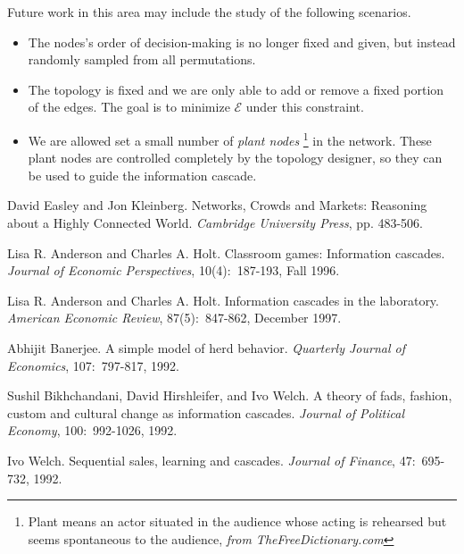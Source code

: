 \documentclass[a4paper,UKenglish]{lipics}
\theoremstyle{definition}
\begin{document}
Future work in this area may include the study of the following scenarios.
\begin{itemize}
\item The nodes's order of decision-making is no longer fixed and given, but instead randomly sampled from all permutations.
\item The topology is fixed and we are only able to add or remove a fixed portion of the edges.
		The goal is to minimize $\mathcal{E}$ under this constraint.
\item We are allowed set a small number of \emph{plant nodes}
	\footnote{Plant means an actor situated in the audience whose acting is rehearsed but seems spontaneous to the audience, 
	\emph{from TheFreeDictionary.com}} in the network.
	These plant nodes are controlled completely by the topology designer, so they can be used to guide the information cascade.
\end{itemize}





\nocite{Simpson}

\begin{thebibliography}{99}

David Easley and Jon Kleinberg. Networks, Crowds and Markets: Reasoning about a Highly Connected World. {\em Cambridge University Press}, pp. 483-506.

Lisa R. Anderson and Charles A. Holt. Classroom games: Information cascades. {\em Journal of Economic Perspectives}, 10(4):~187-193, Fall 1996.

Lisa R. Anderson and Charles A. Holt. Information cascades in the laboratory. {\em American Economic Review}, 87(5):~847-862, December 1997.

Abhijit Banerjee. A simple model of herd behavior. {\em Quarterly Journal of Economics}, 107:~797-817, 1992.

Sushil Bikhchandani, David Hirshleifer, and Ivo Welch. A theory of fads, fashion, custom and cultural change as information cascades. {\em Journal of Political Economy}, 100:~992-1026, 1992.

Ivo Welch. Sequential sales, learning and cascades. {\em Journal of Finance}, 47:~695-732, 1992.

\end{thebibliography}
{}

\end{document}

